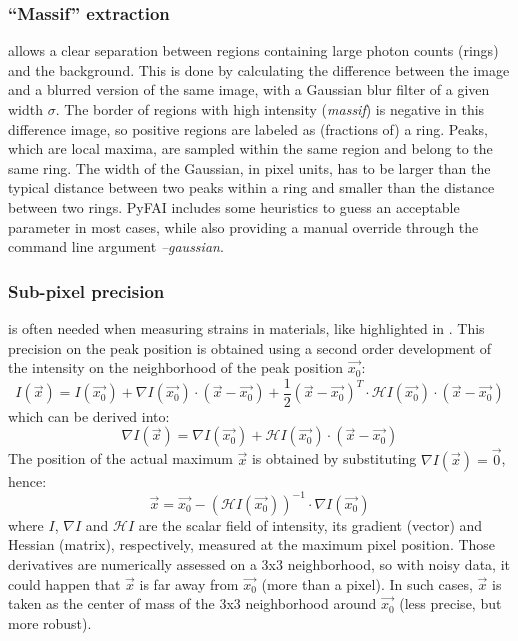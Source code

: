 \documentclass[preprint]{iucr}
\begin{document}
\subsubsection{``Massif'' extraction}
\label{massif}
allows a clear separation between regions containing large
photon counts (rings) and the background.
This is done by calculating the difference between the image and a blurred version
of the same image, with a Gaussian blur filter of a given width $\sigma$.
The border of regions with high intensity (\textit{massif}) is negative in this
difference image, so positive regions are labeled as
(fractions of) a ring. Peaks, which are local maxima,
are sampled within the same region and belong to the same ring.
The width of the Gaussian, in pixel units, has to be larger than the typical
distance between two peaks within a ring and smaller than the distance between two
rings.
PyFAI includes some heuristics to guess an acceptable parameter in most cases,
while also providing a manual override through the command line argument \textit{--gaussian}.

\subsubsection{Sub-pixel precision}
\label{subpixel}
is often needed when measuring strains in materials, like highlighted in
\cite{to5079}.
This precision on the peak position is obtained using a second order
development of the intensity on the neighborhood of the peak position $\overrightarrow{x_0}$:
$$ I(\overrightarrow{x}) = I(\overrightarrow{x_0}) + \nabla
I(\overrightarrow{x_0})\cdot (\overrightarrow{x}-\overrightarrow{x_0}) +
\frac{1}{2} (\overrightarrow{x}-\overrightarrow{x_0})^T\cdot\mathcal{H}
I(\overrightarrow{x_0})\cdot(\overrightarrow{x}-\overrightarrow{x_0})$$ which
can be derived into:
$$\nabla I(\overrightarrow{x}) =\nabla I(\overrightarrow{x_0}) +
\mathcal{H}I(\overrightarrow{x_0})\cdot(\overrightarrow{x}-\overrightarrow{x_0})$$
The position of the actual maximum $\overrightarrow{x}$ is obtained by substituting
$\nabla I(\overrightarrow{x})=\overrightarrow{0}$, hence:
$$\overrightarrow{x} = \overrightarrow{x_0} - (\mathcal{H}
I(\overrightarrow{x_0}))^{-1}\cdot\nabla I(\overrightarrow{x_0})$$ where $I$,
$\nabla I$ and $\mathcal{H} I$ are the scalar field of intensity, its gradient
(vector) and Hessian (matrix), respectively, measured at the maximum pixel position.
Those derivatives are numerically assessed on a 3x3 neighborhood, so with noisy
data, it could happen that $\overrightarrow{x}$ is far away from
$\overrightarrow{x_0}$ (more than a pixel). In such cases, $\overrightarrow{x}$
is taken as the center of mass of the 3x3 neighborhood around
$\overrightarrow{x_0}$ (less precise, but more robust).
\end{document}
